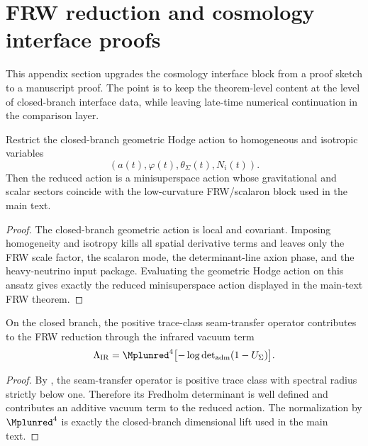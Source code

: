 \section{FRW reduction and cosmology interface proofs}
\label{app:frw-interface-proofs}

This appendix section upgrades the cosmology interface block from a proof sketch to a manuscript
proof. The point is to keep the theorem-level content at the level of closed-branch interface data,
while leaving late-time numerical continuation in the comparison layer.

\begin{lemma}
\label{lem:minisuperspace-reduction-hodge-branch}
Restrict the closed-branch geometric Hodge action to homogeneous and isotropic variables
\[
(a(t),\varphi(t),\theta_\Sigma(t),N_i(t)).
\]
Then the reduced action is a minisuperspace action whose gravitational and scalar sectors coincide
with the low-curvature FRW/scalaron block used in the main text.
\end{lemma}

\begin{proof}
The closed-branch geometric action is local and covariant. Imposing homogeneity and isotropy kills
all spatial derivative terms and leaves only the FRW scale factor, the scalaron mode, the
determinant-line axion phase, and the heavy-neutrino input package. Evaluating the geometric Hodge
action on this ansatz gives exactly the reduced minisuperspace action displayed in the main-text FRW
theorem.
\end{proof}

\begin{lemma}
\label{lem:seam-transfer-vacuum-term}
On the closed branch, the positive trace-class seam-transfer operator contributes to the FRW
reduction through the infrared vacuum term
\[
\Lambda_{\mathrm{IR}}
=
\Mplunred^4\bigl[-\log\det\nolimits_{\mathrm{adm}}(1-U_\Sigma)\bigr].
\]
\end{lemma}

\begin{proof}
By , the seam-transfer operator is positive trace class with spectral
radius strictly below one. Therefore its Fredholm determinant is well defined and contributes an
additive vacuum term to the reduced action. The normalization by $\Mplunred^4$ is exactly the
closed-branch dimensional lift used in the main text.
\end{proof}

